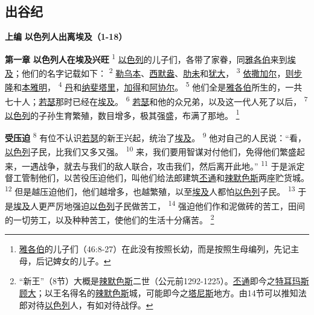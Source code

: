 \setlength\columnsep{0.6cm}
\begin{multicols}{2}

\chapter*{出谷纪}


\begin{center}
	\textbf{上编 }
	\textbf{以色列人出离埃及（1-18）}
\end{center}

\textbf{第一章 }
\textbf{以色列人在埃及兴旺 }
\textsuperscript{1}
\uline{以色列}的儿子们，各带了家眷，同\uline{雅各伯}来到\uline{埃及}；他们的名字记载如下：
\textsuperscript{2}
\uline{勒乌本}、\uline{西默盎}、\uline{肋未}和\uline{犹大}，
\textsuperscript{3}
\uline{依撒}\uline{加尔}，\uline{则步隆}和\uline{本雅明}，
\textsuperscript{4}
\uline{丹}和\uline{纳斐塔里}，\uline{加得}和\uline{阿协尔}。
\textsuperscript{5}
他们全是\uline{雅各伯}所生的，一共七十人；\uline{若瑟}那时已经在\uline{埃及}。
\textsuperscript{6}
\uline{若瑟}和他的众兄弟，以及这一代人死了以后，
\textsuperscript{7}
\uline{以色列}的子孙生育繁殖，数目增多，极其强盛，布满了那地。
\renewcommand\thefootnote{\ding{\numexpr171+\value{footnote}}}
\footnote{\uline{雅各伯}的儿子们（46:8-27）在此没有按照长幼，而是按照生母编列，先记主母，后记婢女的儿子。}

\textbf{受压迫 }
\textsuperscript{8}
有位不认识\uline{若瑟}的新王兴起，统治了\uline{埃及}。
\textsuperscript{9}
他对自己的人民说：“看，\uline{以色列}子民，比我们又多又强。
\textsuperscript{10}
来，我们要用智谋对付他们，免得他们繁盛起来，一遇战争，就去与我们的敌人联合，攻击我们，然后离开此地。”
\textsuperscript{11}
于是派定督工管制他们，以苦役压迫他们，叫他们给法郎建筑\uline{丕通}和\uline{辣默}\uline{色斯}两座贮货城。
\textsuperscript{12}
但是越压迫他们，他们越增多，也越繁殖，以至\uline{埃及}人都怕\uline{以色列}子民。
\textsuperscript{13}
于是\uline{埃及}人更严厉地强迫\uline{以色列}子民做苦工，
\textsuperscript{14}
强迫他们作和泥做砖的苦工，田间的一切劳工，以及种种苦工，使他们的生活十分痛苦。
\footnote{“新王”（8节）大概是\uline{辣默色斯}二世（公元前1292-1225）。\uline{丕通}即今之\uline{特耳玛斯}\uline{顾大}；以王名得名的\uline{辣默色斯}城，可能即今之\uline{塔尼斯}地方。由14节可以推知法郎对待\uline{以色列}人，有如对待战俘。}


\end{multicols}

